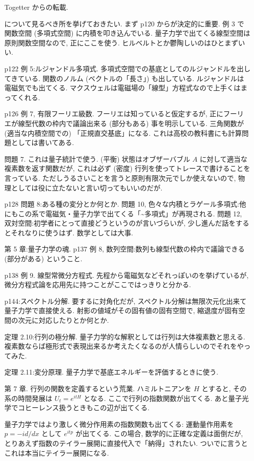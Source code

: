 \documentclass[openany, a4paper, oneside]{jsbook}
\theoremstyle{break}
\theoremstyle{breakdefn}
\begin{document}
Togetter からの転載.

\cite{MasahikoSaitoh1} について見るべき所を挙げておきたい.
まず p120 からが決定的に重要.
例 3 で関数空間 (多項式空間) に内積を叩き込んでいる.
量子力学で出てくる線型空間は原則関数空間なので, 正にここを使う.
ヒルベルトとか鬱陶しいのはひとまずいい.

p122 例 5:ルジャンドル多項式.
多項式空間での基底としてのルジャンドルを出してきている.
関数のノルム (ベクトルの「長さ」) も出している.
ルジャンドルは電磁気でも出てくる.
マクスウェルは電磁場の「線型」方程式なので上手くはまってくれる.

p126 例 7, 有限フーリエ級数.
フーリエは知っていると仮定するが, 正にフーリエが線型代数の枠内で議論出来る (部分もある) 事を明示している.
三角関数が (適当な内積空間での) 「正規直交基底」になる.
これは高校の教科書にも計算問題としては書いてある.

問題 7. これは量子統計で使う.
(平衡) 状態はオブザーバブル $A$ に対して適当な複素数を返す関数だが,
これは必ず (密度) 行列を使ってトレースで書けることを言っている.
ただしうるさいことを言うと原則有限次元でしか使えないので, 物理としては役に立たないと言い切ってもいいのだが.

p128 問題 8:ある種の変分とか何とか.
問題 10, 色々な内積とラゲール多項式:他にもこの系で電磁気・量子力学で出てくる「\~{}多項式」が再現される.
問題 12, 双対空間:初学者にとって直接どうというのが言いづらいが, 少し進んだ話をするとそれなりに使うはず.
数学としては大事.

第 5 章:量子力学の魂.
p137 例 8, 数列空間:数列も線型代数の枠内で議論できる (部分がある) ということ.

p138 例 9. 線型常微分方程式.
先程から電磁気などそれっぽいのを挙げているが, 微分方程式論を応用先に持つことがここではっきりと分かる.

p144:スペクトル分解. 要するに対角化だが, スペクトル分解は無限次元化出来て量子力学で直接使える.
射影の値域がその固有値の固有空間で, 縮退度が固有空間の次元に対応したりとか何とか.

定理 2.10:行列の極分解.
量子力学的な解釈としては行列は大体複素数と思える.
複素数ならば極形式で表現出来るか考えたくなるのが人情らしいのでそれをやってみた.

定理 2.11:変分原理.
量子力学で基底エネルギーを評価するときに使う.

第 7 章. 行列の関数を定義するという荒業.
ハミルトニアンを $H$ とすると, その系の時間発展は $U_t=e^{itH}$ となる.
ここで行列の指数関数が出てくる.
あと量子光学でコヒーレンス扱うときもこの辺が出てくる.

量子力学ではより激しく微分作用素の指数関数も出てくる:
運動量作用素を $p=-id/dx$ として $e^{itp}$ が出てくる.
この場合, 数学的に正確な定義は面倒だが, とりあえず指数のテイラー展開に直接代入で「納得」されたい.
ついでに言うとこれは本当にテイラー展開になる.
\end{document}
